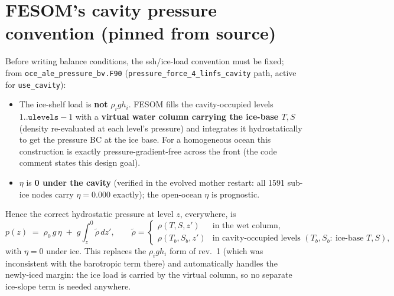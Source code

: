 \documentclass[11pt,a4paper]{article}
\newcommand{\code}[1]{\texttt{#1}}
\begin{document}
\section{FESOM's cavity pressure convention (pinned from source)}\label{sec:convention}
Before writing balance conditions, the ssh/ice-load convention must be fixed; from
\code{oce\_ale\_pressure\_bv.F90} (\code{pressure\_force\_4\_linfs\_cavity} path, active for
\code{use\_cavity}):
\begin{itemize}[leftmargin=1.5em,itemsep=1pt]
  \item The ice-shelf load is \textbf{not} $\rho_i g h_i$. FESOM fills the cavity-occupied levels
        $1..\code{ulevels}{-}1$ with a \textbf{virtual water column carrying the ice-base $T,S$}
        (density re-evaluated at each level's pressure) and integrates it hydrostatically to get
        the pressure BC at the ice base. For a homogeneous ocean this construction is exactly
        pressure-gradient-free across the front (the code comment states this design goal).
  \item $\eta$ is \textbf{0 under the cavity} (verified in the evolved mother restart: all 1591
        sub-ice nodes carry $\eta=0.000$ exactly); the open-ocean $\eta$ is prognostic.
\end{itemize}
Hence the correct hydrostatic pressure at level $z$, everywhere, is
\begin{equation}
  p(z) \;=\; \rho_0\, g\, \eta \;+\; g\!\!\int_z^{0}\!\tilde\rho\,dz',\qquad
  \tilde\rho =
  \begin{cases}
    \rho(T,S,z') & \text{in the wet column},\\[2pt]
    \rho(T_b,S_b,z') & \text{in cavity-occupied levels } (T_b,S_b:\ \text{ice-base } T,S),
  \end{cases}
  \label{eq:pressure}
\end{equation}
with $\eta{=}0$ under ice. This replaces the $\rho_i g h_i$ form of rev.~1 (which was inconsistent
with the barotropic term there) and automatically handles the newly-iced margin: the ice load is
carried by the virtual column, so no separate ice-slope term is needed anywhere.
\end{document}
